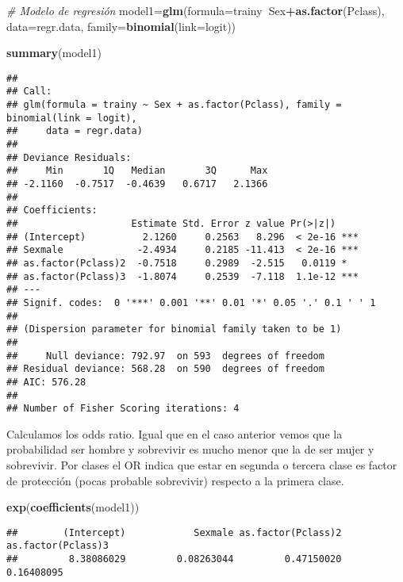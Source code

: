 \documentclass[
]{article}
\newenvironment{Shaded}{\begin{snugshade}}{\end{snugshade}}
\newcommand{\CommentTok}[1]{\textcolor[rgb]{0.56,0.35,0.01}{\textit{#1}}}
\newcommand{\DataTypeTok}[1]{\textcolor[rgb]{0.13,0.29,0.53}{#1}}
\newcommand{\KeywordTok}[1]{\textcolor[rgb]{0.13,0.29,0.53}{\textbf{#1}}}
\newcommand{\NormalTok}[1]{#1}
\newcommand{\OperatorTok}[1]{\textcolor[rgb]{0.81,0.36,0.00}{\textbf{#1}}}
\begin{document}
\begin{Shaded}
\begin{Highlighting}[]
\CommentTok{# Modelo de regresión}
\NormalTok{model1=}\KeywordTok{glm}\NormalTok{(}\DataTypeTok{formula=}\NormalTok{trainy}\OperatorTok{~}\NormalTok{Sex}\OperatorTok{+}\KeywordTok{as.factor}\NormalTok{(Pclass), }\DataTypeTok{data=}\NormalTok{regr.data,}
           \DataTypeTok{family=}\KeywordTok{binomial}\NormalTok{(}\DataTypeTok{link=}\NormalTok{logit))}

\KeywordTok{summary}\NormalTok{(model1)}
\end{Highlighting}
\end{Shaded}

\begin{verbatim}
## 
## Call:
## glm(formula = trainy ~ Sex + as.factor(Pclass), family = binomial(link = logit), 
##     data = regr.data)
## 
## Deviance Residuals: 
##     Min       1Q   Median       3Q      Max  
## -2.1160  -0.7517  -0.4639   0.6717   2.1366  
## 
## Coefficients:
##                    Estimate Std. Error z value Pr(>|z|)    
## (Intercept)          2.1260     0.2563   8.296  < 2e-16 ***
## Sexmale             -2.4934     0.2185 -11.413  < 2e-16 ***
## as.factor(Pclass)2  -0.7518     0.2989  -2.515   0.0119 *  
## as.factor(Pclass)3  -1.8074     0.2539  -7.118  1.1e-12 ***
## ---
## Signif. codes:  0 '***' 0.001 '**' 0.01 '*' 0.05 '.' 0.1 ' ' 1
## 
## (Dispersion parameter for binomial family taken to be 1)
## 
##     Null deviance: 792.97  on 593  degrees of freedom
## Residual deviance: 568.28  on 590  degrees of freedom
## AIC: 576.28
## 
## Number of Fisher Scoring iterations: 4
\end{verbatim}

\texttt{}

Calculamos los odds ratio. Igual que en el caso anterior vemos que la
probabilidad ser hombre y sobrevivir es mucho menor que la de ser mujer
y sobrevivir. Por clases el OR indica que estar en segunda o tercera
clase es factor de protección (pocas probable sobrevivir) respecto a la
primera clase.

\texttt{}

\begin{Shaded}
\begin{Highlighting}[]
\KeywordTok{exp}\NormalTok{(}\KeywordTok{coefficients}\NormalTok{(model1))}
\end{Highlighting}
\end{Shaded}

\begin{verbatim}
##        (Intercept)            Sexmale as.factor(Pclass)2 as.factor(Pclass)3 
##         8.38086029         0.08263044         0.47150020         0.16408095
\end{verbatim}
\end{document}
